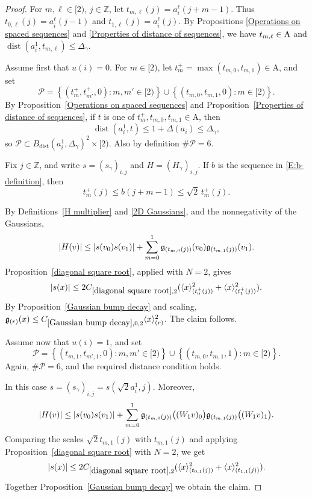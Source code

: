 \documentclass[12pt,reqno]{amsart}
\theoremstyle{plain}
\numberwithin{equation}{section}
\theoremstyle{remark}
\newcommand{\Z}{{\mathbb Z}}
\DeclareMathOperator{\dist}{dist}
\begin{document}
\begin{proof}
For $m,\ell\in[2)$, $j\in\Z$, let
$t_{m,\ell}(j)=a_i^\ell(j+m-1).$
Thus $t_{0,\ell}(j)=a_i^\ell(j-1)$ and
$t_{1,\ell}(j)=a_i^\ell(j)$. By Propositions
\ref{Operations on spaced sequences} and
\ref{Properties of distance of sequences}, we have
$t_{m,\ell}\in{\rm A}$ and
$\dist(a_i^1,t_{m,\ell})
\le \Delta_\gamma$.

Assume first that $u(i)=0$. For $m\in[2)$, let
$t_m^+=\max(t_{m,0},t_{m,1})\in \mathrm{A}$, and set
\[
\mathcal P
=
\left\{
(t_m^+,t_{m'}^+,0):m,m'\in[2)
\right\}
\cup
\left\{
(t_{m,0},t_{m,1},0):m\in[2)
\right\}.
\]
By Proposition~\ref{Operations on spaced sequences} and Proposition~\ref{Properties of distance of sequences}, if $t$ is one of $t_m^+,t_{m,0},t_{m,1}\in\mathrm{A}$, then
\[\dist(a_i^1,t)\le 1 + \Delta(a_i)\le \Delta_\gamma,\]
so $\mathcal P\subset{B_{\dist}(a_i^1,\Delta_\gamma)}^2\times[2)$. Also by definition
$\#\mathcal P=6$.

Fix $j\in\mathbb Z$, and write
$s=(s_\gamma)_{i,j}$ and $H=(H_\gamma)_{i,j}$. If $b$ is the
sequence in \eqref{E:b-definition}, then
\[
t_m^+(j)\le b(j+m-1)\le\sqrt2\,t_m^+(j).
\]

By Definitions~\ref{H multiplier} and \ref{2D Gaussians}, and the
nonnegativity of the Gaussians,
\[
|H(v)|
\le
|s(v_0)s(v_1)|
+
\sum_{m=0}^1
\mathfrak{g}_{(t_{m,0}(j))}(v_0)
\mathfrak{g}_{(t_{m,1}(j))}(v_1).
\]
Proposition~\ref{diagonal square root}, applied with $N=2$,
gives
\[
|s(x)|
\le
2C_{\ref{diagonal square root},2}
(\langle x\rangle_{(t_0^+(j))}^2+
\langle x\rangle_{(t_1^+(j))}^2).
\]
By Proposition~\ref{Gaussian bump decay} and scaling,
$\mathfrak{g}_{(r)}(x)\le
C_{\ref{Gaussian bump decay},0,2}\langle x\rangle_{(r)}^2$. The claim follows.

Assume now that $u(i)=1$, and set
\[
\mathcal P
=
\left\{
(t_{m,1},t_{m',1},0):m,m'\in[2)
\right\}
\cup
\left\{
(t_{m,0},t_{m,1},1):m\in[2)
\right\}.
\]
Again, $\#\mathcal P=6$, and the required distance condition
holds.

In this case $s=(s_\gamma)_{i,j}=s(\sqrt2a_i^1,j)$.
Moreover,
\[
|H(v)|
\le
|s(v_0)s(v_1)|
+
\sum_{m=0}^1
\mathfrak{g}_{(t_{m,0}(j))}\bigl((W_1v)_0\bigr)
\mathfrak{g}_{(t_{m,1}(j))}\bigl((W_1v)_1\bigr).
\]
Comparing the scales $\sqrt2t_{m,1}(j)$ with $t_{m,1}(j)$ and
applying Proposition~\ref{diagonal square root} with $N=2$, we get
\[
|s(x)|
\le
2C_{\ref{diagonal square root},2}
(
\langle x\rangle_{(t_{0,1}(j))}^2
+
\langle x\rangle_{(t_{1,1}(j))}^2
).
\]
Together Proposition~\ref{Gaussian bump decay} we obtain the claim.
\end{proof}
\end{document}
